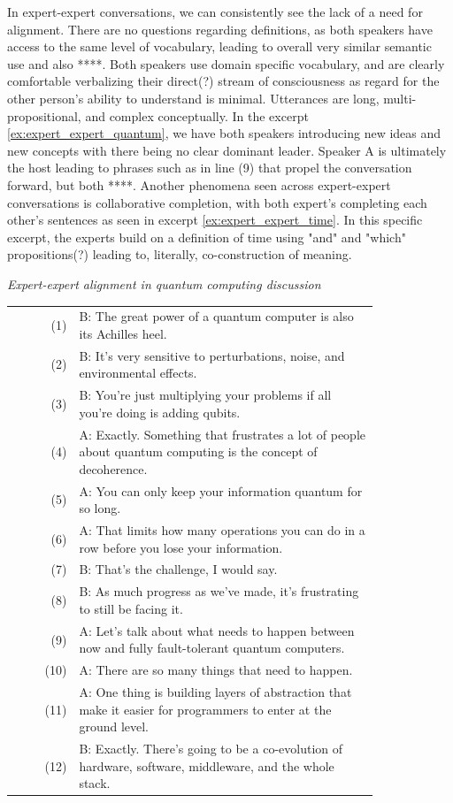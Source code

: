 \documentclass{article}
\makeatletter
\theoremstyle{definition}
\newcounter{excerpt}
\newenvironment{excerpt}[1][]
  {\refstepcounter{excerpt}\par\medskip\noindent\textit{#1}\par\smallskip
   \begin{tabular}{@{}r@{\quad}p{0.82\linewidth}@{}}}
  {\end{tabular}\par\medskip}
\numberwithin{table}{section}
\makeatother
\begin{document}
In expert-expert conversations, we can consistently see the lack of a need for alignment. There are no questions regarding definitions, as both speakers have access to the same level of vocabulary, leading to overall very similar semantic use and also ****. Both speakers use domain specific vocabulary, and are clearly comfortable verbalizing their direct(?) stream of consciousness as regard for the other person's ability to understand is minimal. Utterances are long, multi-propositional, and complex conceptually.  In the excerpt \ref{ex:expert_expert_quantum}, we have both speakers introducing new ideas and new concepts with there being no clear dominant leader. Speaker A is ultimately the host leading to phrases such as in line (9) that propel the conversation forward, but both ****. Another phenomena seen across expert-expert conversations is collaborative completion, with both expert's completing each other's sentences as seen in excerpt \ref{ex:expert_expert_time}. In this specific excerpt, the experts build on a definition of time using "and" and "which" propositions(?) leading to, literally, co-construction of meaning. 

\begin{excerpt}[Expert-expert alignment in quantum computing discussion]\footnotemark
\label{ex:expert_expert_quantum}
(1)  & B: The great power of a quantum computer is also its Achilles heel. \\
(2)  & B: It's very sensitive to perturbations, noise, and environmental effects. \\
(3)  & B: You're just multiplying your problems if all you're doing is adding qubits. \\
(4)  & A: Exactly. Something that frustrates a lot of people about quantum computing is the concept of decoherence. \\
(5)  & A: You can only keep your information quantum for so long. \\
(6)  & A: That limits how many operations you can do in a row before you lose your information. \\
(7)  & B: That's the challenge, I would say. \\
(8)  & B: As much progress as we've made, it's frustrating to still be facing it. \\
(9)  & A: Let's talk about what needs to happen between now and fully fault-tolerant quantum computers. \\
(10) & A: There are so many things that need to happen. \\
(11) & A: One thing is building layers of abstraction that make it easier for programmers to enter at the ground level. \\
(12) & B: Exactly. There's going to be a co-evolution of hardware, software, middleware, and the whole stack. \\
\end{excerpt}
\end{document}
